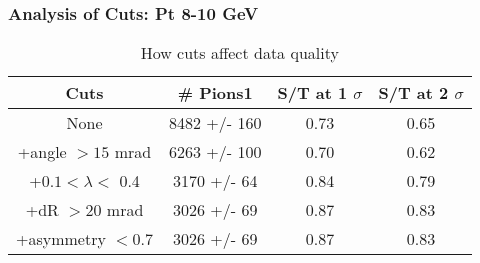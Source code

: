 \frame
{
\frametitle{Analysis of Cuts: Pt  8-10 GeV}
\begin{table}
\caption{How cuts affect data quality}
\centering
\begin{tabular}{c c c c}
\hline\hline
Cuts & \# Pions1 & S/T at 1 $\sigma$ & S/T at 2 $\sigma$ \\ [0.5ex]
\hline
None & 8482 +/-  160 & 0.73 & 0.65 \\ %
+angle $> 15$ mrad & 6263 +/-  100 & 0.70 & 0.62 \\ %
+$0.1 < \lambda <$ 0.4 & 3170 +/-   64 & 0.84 & 0.79 \\ %
+dR $> 20$ mrad & 3026 +/-   69 & 0.87 & 0.83 \\ %
+asymmetry $< 0.7$ & 3026 +/-   69 & 0.87 & 0.83 \\ %
[1ex]
\hline
\end{tabular}
\label{table:nonlin}
\end{table}
}

